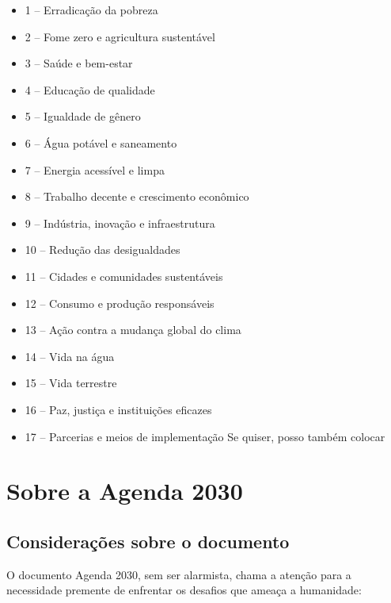 \begin{itemize}
\item  1 – Erradicação da pobreza    
\item  2 – Fome zero e agricultura sustentável                                 
\item  3 – Saúde e bem-estar                                                   
\item  4 – Educação de qualidade                                               
\item  5 – Igualdade de gênero                                                 
\item  6 – Água potável e saneamento                                           
\item  7 – Energia acessível e limpa                                           
\item  8 – Trabalho decente e crescimento econômico                            
\item  9 – Indústria, inovação e infraestrutura                                
\item  10 – Redução das desigualdades                                          
\item  11 – Cidades e comunidades sustentáveis                                 
\item  12 – Consumo e produção responsáveis                                    
\item  13 – Ação contra a mudança global do clima                              
\item  14 – Vida na água                                                       
\item  15 – Vida terrestre                                                     
\item  16 – Paz, justiça e instituições eficazes                               
\item  17 – Parcerias e meios de implementação Se quiser, posso também colocar
 \end{itemize}
 \chapter{Sobre a Agenda 2030}
 \section{Considerações sobre o documento}
O documento Agenda 2030, sem ser alarmista, chama a atenção para a necessidade premente de enfrentar os desafios que ameaça a humanidade:

